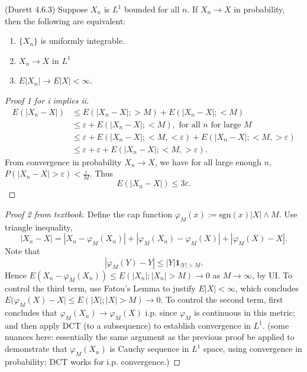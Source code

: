 
\begin{theorem}
	(Durett 4.6.3)
	Suppose $X_n$ is $L^1$ bounded for all $n$. If $X_n \to  X$ in probability, then the following are equivalent: 
	\begin{enumerate}
		\item  $\{X_n\} $ is uniformly integrable.
		\item $X_n \to  X$ in $L^1$
		\item  $E|X_n| \to E|X| < \infty $.
	\end{enumerate}
\end{theorem}
\begin{proof}[Proof 1 for i implies ii]
	\begin{align*}
		E(|X_n - X|)
		&\leq E(|X_n - X| ; > M) + E(|X_n - X| ; < M) \\
		&\leq \varepsilon + E(|X_n - X| ; < M), \text{ for all $n $ for large $M$} \\
		&\leq \varepsilon + E(|X_n - X| ; < M, < \varepsilon) + E(|X_n - X| ; < M, > \varepsilon) \\
		&\leq \varepsilon + \varepsilon + E(|X_n - X| ; < M, > \varepsilon)
	.\end{align*}
	From convergence in probability $X_n \to X$, we have for all large enough $n$, $P(|X_n - X| > \varepsilon) < \frac{\varepsilon}{M}$. Thus
	\[
		E(|X_n - X|) \le 3 \varepsilon
	.\] 
	
\end{proof}
\begin{proof}[Proof 2 from textbook]
	Define the cap function $\varphi_M(x) := \text{sgn}(x) |X|\wedge M$. Use triangle inequality,
	\[
		|X_n - X| = |X_n - \varphi_M(X_n)| + |\varphi_M(X_n) - \varphi_M(X)| + |\varphi_M(X) - X|
	.\] 
	Note that
	\[
		\left| \varphi_M(Y) - Y \right| \le |Y| \mathbf{1}_{|Y| > M}
	.\] 
	Hence $E\left( X_n - \varphi_M(X_n) \right) \le E\left( |X_n| ; |X_n| > M \right) \to  0$ as $M \to  \infty $, by UI. To control the third term, use Fatou's Lemma to justify $E|X| < \infty $, which concludes $E(\varphi_M(X) - X| \le E(|X| ; |X| > M) \to  0$. To control the second term, first concludes that $\varphi_M(X_n) \to \varphi_M(X)$ i.p. since $\varphi_M$ is continuous in this metric; and then apply DCT (to a subsequence) to establish convergence in $L^1$. (some nuances here: essentially the same argument as the previous proof be applied to demonstrate that $\varphi_M(X_n) $ is Cauchy sequence in $L^1$ space, using convergence in probability; DCT works for i.p. convergence.)
\end{proof}


